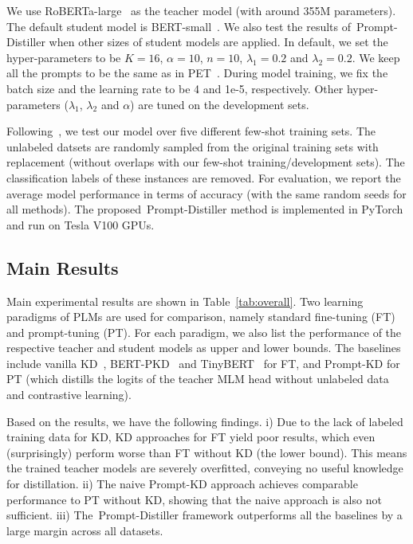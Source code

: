 \documentclass{article}
\begin{document}
We use RoBERTa-large~\cite{DBLP:journals/corr/abs-1907-11692} as the teacher model (with around 355M parameters). The default student model is BERT-small~\cite{DBLP:journals/corr/abs-1908-08962}. We also test the results of~{Prompt-Distiller} when other sizes of student models are applied. In default, we set the hyper-parameters to be $K=16$, $\alpha=10$, $n=10$, $\lambda_1=0.2$ and $\lambda_2=0.2$. We keep all the prompts to be the same as in PET~\cite{DBLP:conf/eacl/SchickS21}. During model training, we fix the batch size and the learning rate to be 4 and 1e-5, respectively. Other hyper-parameters ($\lambda_1$, $\lambda_2$ and $\alpha$) are tuned on the development sets.

Following~\cite{DBLP:conf/acl/GaoFC20}, we test our model over five different few-shot training sets. The unlabeled datsets are randomly sampled from the original training sets with replacement (without overlaps with our few-shot training/development sets). The classification labels of these instances are removed.
For evaluation, we report the average model performance in terms of accuracy (with the same random seeds for all methods). The proposed~{Prompt-Distiller} method is implemented in PyTorch and run on Tesla V100 GPUs.





\subsection{Main Results}

Main experimental results are shown in Table~\ref{tab:overall}. Two learning paradigms of PLMs are used for comparison, namely standard fine-tuning (FT) and prompt-tuning (PT). For each paradigm, we also list the performance of the respective teacher and student models as upper and lower bounds. The baselines include vanilla KD~\cite{DBLP:journals/corr/abs-1903-12136}, BERT-PKD~\cite{DBLP:conf/emnlp/SunCGL19} and TinyBERT~\cite{DBLP:conf/emnlp/JiaoYSJCL0L20} for FT, and Prompt-KD for PT (which distills the logits of the teacher MLM head without unlabeled data and contrastive learning).

Based on the results, we have the following findings. i) Due to the lack of labeled training data for KD, KD approaches for FT yield poor results, which even (surprisingly) perform worse than FT without KD (the lower bound). This means the trained teacher models are severely overfitted, conveying no useful knowledge for distillation. ii) The naive Prompt-KD approach achieves comparable performance to PT without KD, showing that the naive approach is also not sufficient. iii) The~{Prompt-Distiller} framework outperforms all the baselines by a large margin across all datasets.
\end{document}
